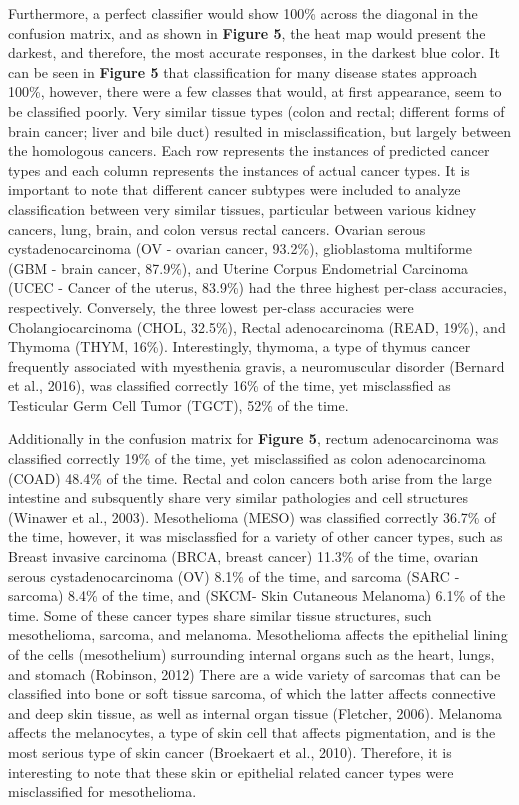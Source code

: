 \documentclass[12pt,]{article}
\begin{document}
Furthermore, a perfect classifier would show 100\% across the diagonal
in the confusion matrix, and as shown in \textbf{Figure 5}, the heat map
would present the darkest, and therefore, the most accurate responses,
in the darkest blue color. It can be seen in \textbf{Figure 5} that
classification for many disease states approach 100\%, however, there
were a few classes that would, at first appearance, seem to be
classified poorly. Very similar tissue types (colon and rectal;
different forms of brain cancer; liver and bile duct) resulted in
misclassification, but largely between the homologous cancers. Each row
represents the instances of predicted cancer types and each column
represents the instances of actual cancer types. It is important to note
that different cancer subtypes were included to analyze classification
between very similar tissues, particular between various kidney cancers,
lung, brain, and colon versus rectal cancers. Ovarian serous
cystadenocarcinoma (OV - ovarian cancer, 93.2\%), glioblastoma
multiforme (GBM - brain cancer, 87.9\%), and Uterine Corpus Endometrial
Carcinoma (UCEC - Cancer of the uterus, 83.9\%) had the three highest
per-class accuracies, respectively. Conversely, the three lowest
per-class accuracies were Cholangiocarcinoma (CHOL, 32.5\%), Rectal
adenocarcinoma (READ, 19\%), and Thymoma (THYM, 16\%). Interestingly,
thymoma, a type of thymus cancer frequently associated with myesthenia
gravis, a neuromuscular disorder (Bernard et al., 2016), was classified
correctly 16\% of the time, yet misclassfied as Testicular Germ Cell
Tumor (TGCT), 52\% of the time.

Additionally in the confusion matrix for \textbf{Figure 5}, rectum
adenocarcinoma was classified correctly 19\% of the time, yet
misclassified as colon adenocarcinoma (COAD) 48.4\% of the time. Rectal
and colon cancers both arise from the large intestine and subsquently
share very similar pathologies and cell structures (Winawer et al.,
2003). Mesothelioma (MESO) was classified correctly 36.7\% of the time,
however, it was misclassfied for a variety of other cancer types, such
as Breast invasive carcinoma (BRCA, breast cancer) 11.3\% of the time,
ovarian serous cystadenocarcinoma (OV) 8.1\% of the time, and sarcoma
(SARC - sarcoma) 8.4\% of the time, and (SKCM- Skin Cutaneous Melanoma)
6.1\% of the time. Some of these cancer types share similar tissue
structures, such mesothelioma, sarcoma, and melanoma. Mesothelioma
affects the epithelial lining of the cells (mesothelium) surrounding
internal organs such as the heart, lungs, and stomach (Robinson, 2012)
There are a wide variety of sarcomas that can be classified into bone or
soft tissue sarcoma, of which the latter affects connective and deep
skin tissue, as well as internal organ tissue (Fletcher, 2006). Melanoma
affects the melanocytes, a type of skin cell that affects pigmentation,
and is the most serious type of skin cancer (Broekaert et al., 2010).
Therefore, it is interesting to note that these skin or epithelial
related cancer types were misclassified for mesothelioma.
\end{document}
